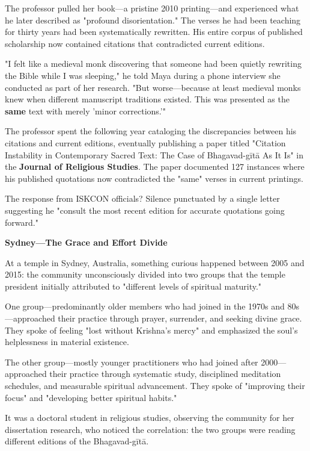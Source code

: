 \documentclass[12pt,twoside]{book}
\begin{document}
The professor pulled her book—a pristine 2010 printing—and experienced what he later described as "profound disorientation." The verses he had been teaching for thirty years had been systematically rewritten. His entire corpus of published scholarship now contained citations that contradicted current editions.

"I felt like a medieval monk discovering that someone had been quietly rewriting the Bible while I was sleeping," he told Maya during a phone interview she conducted as part of her research. "But worse—because at least medieval monks knew when different manuscript traditions existed. This was presented as the \textbf{same} text with merely 'minor corrections.'"

The professor spent the following year cataloging the discrepancies between his citations and current editions, eventually publishing a paper titled "Citation Instability in Contemporary Sacred Text: The Case of Bhagavad-gītā As It Is" in the \textbf{Journal of Religious Studies}. The paper documented 127 instances where his published quotations now contradicted the "same" verses in current printings.

The response from ISKCON officials? Silence punctuated by a single letter suggesting he "consult the most recent edition for accurate quotations going forward."

\textbf{\textbf{Sydney—The Grace and Effort Divide}}

At a temple in Sydney, Australia, something curious happened between 2005 and 2015: the community unconsciously divided into two groups that the temple president initially attributed to "different levels of spiritual maturity."

One group—predominantly older members who had joined in the 1970s and 80s—approached their practice through prayer, surrender, and seeking divine grace. They spoke of feeling "lost without Krishna's mercy" and emphasized the soul's helplessness in material existence.

The other group—mostly younger practitioners who had joined after 2000—approached their practice through systematic study, disciplined meditation schedules, and measurable spiritual advancement. They spoke of "improving their focus" and "developing better spiritual habits."

It was a doctoral student in religious studies, observing the community for her dissertation research, who noticed the correlation: the two groups were reading different editions of the Bhagavad-gītā.
\end{document}
